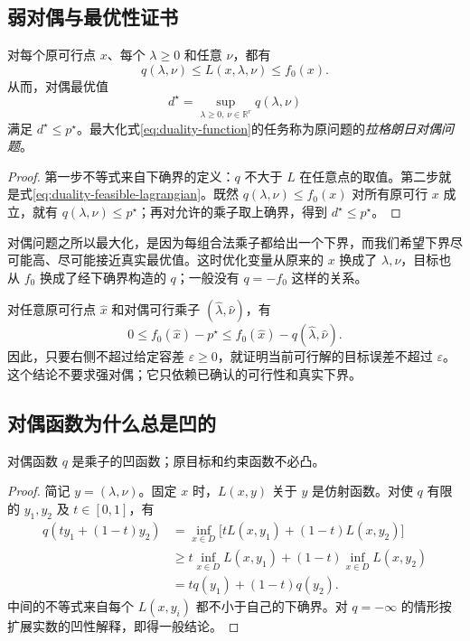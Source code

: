 \documentclass[UTF8,12pt,a4paper,fontset=fandol]{ctexart}
\begin{document}
\subsection{弱对偶与最优性证书}

\begin{theorem}[弱对偶]
\label{thm:duality-weak}
对每个原可行点 $x$、每个 $\lambda\geq0$ 和任意 $\nu$，都有
\begin{equation}
 q(\lambda,\nu)\leq L(x,\lambda,\nu)\leq f_0(x).
 \label{eq:duality-bound-chain}
\end{equation}
从而，对偶最优值
\begin{equation}
 d^\star=\sup_{\lambda\geq0,\,\nu\in\mathbb R^r}q(\lambda,\nu)
 \label{eq:duality-dual-problem}
\end{equation}
满足 $d^\star\leq p^\star$。最大化式\eqref{eq:duality-function}的任务称为原问题的\emph{拉格朗日对偶问题}。
\end{theorem}
\begin{proof}
第一步不等式来自下确界的定义：$q$ 不大于 $L$ 在任意点的取值。第二步就是式\eqref{eq:duality-feasible-lagrangian}。既然 $q(\lambda,\nu)\leq f_0(x)$ 对所有原可行 $x$ 成立，就有 $q(\lambda,\nu)\leq p^\star$；再对允许的乘子取上确界，得到 $d^\star\leq p^\star$。
\end{proof}

对偶问题之所以最大化，是因为每组合法乘子都给出一个下界，而我们希望下界尽可能高、尽可能接近真实最优值。这时优化变量从原来的 $x$ 换成了 $\lambda,\nu$，目标也从 $f_0$ 换成了经下确界构造的 $q$；一般没有 $q=-f_0$ 这样的关系。

对任意原可行点 $\widehat x$ 和对偶可行乘子 $(\widehat\lambda,\widehat\nu)$，有
\begin{equation}
 0\leq f_0(\widehat x)-p^\star
 \leq f_0(\widehat x)-q(\widehat\lambda,\widehat\nu).
 \label{eq:duality-certificate}
\end{equation}
因此，只要右侧不超过给定容差 $\varepsilon\geq0$，就证明当前可行解的目标误差不超过 $\varepsilon$。这个结论不要求强对偶；它只依赖已确认的可行性和真实下界。

\subsection{对偶函数为什么总是凹的}

\begin{proposition}
对偶函数 $q$ 是乘子的凹函数；原目标和约束函数不必凸。
\end{proposition}
\begin{proof}
简记 $y=(\lambda,\nu)$。固定 $x$ 时，$L(x,y)$ 关于 $y$ 是仿射函数。对使 $q$ 有限的 $y_1,y_2$ 及 $t\in[0,1]$，有
\begin{align*}
 q(ty_1+(1-t)y_2)
 &=\inf_{x\in D}\bigl[tL(x,y_1)+(1-t)L(x,y_2)\bigr]\\
 &\geq t\inf_{x\in D}L(x,y_1)+(1-t)\inf_{x\in D}L(x,y_2)\\
 &=tq(y_1)+(1-t)q(y_2).
\end{align*}
中间的不等式来自每个 $L(x,y_i)$ 都不小于自己的下确界。对 $q=-\infty$ 的情形按扩展实数的凹性解释，即得一般结论。
\end{proof}
\end{document}
